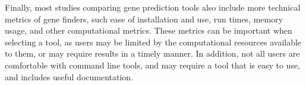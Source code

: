 Finally, most studies comparing gene prediction tools also include more technical metrics of gene finders, such ease of installation and use, run times, memory usage, and other computational metrics. These metrics can be important when selecting a tool, as users may be limited by the computational resources available to them, or may require results in a timely manner. In addition, not all users are comfortable with command line tools, and may require a tool that is easy to use, and includes useful documentation.  




